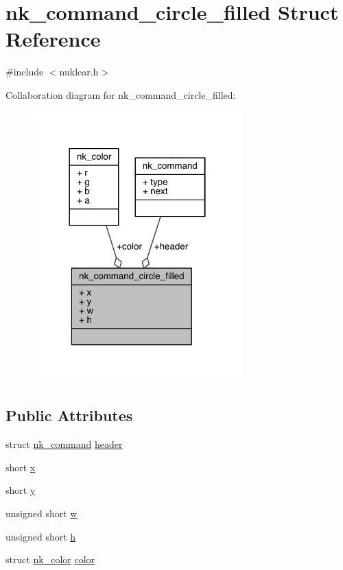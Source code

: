 \hypertarget{structnk__command__circle__filled}{}\section{nk\+\_\+command\+\_\+circle\+\_\+filled Struct Reference}
\label{structnk__command__circle__filled}


{\ttfamily \#include $<$nuklear.\+h$>$}



Collaboration diagram for nk\+\_\+command\+\_\+circle\+\_\+filled\+:
\nopagebreak
\begin{figure}[H]
\begin{center}
\leavevmode
\includegraphics[width=228pt]{structnk__command__circle__filled__coll__graph}
\end{center}
\end{figure}
\subsection*{Public Attributes}
\begin{DoxyCompactItemize}
\item 
struct \mbox{\hyperlink{structnk__command}{nk\+\_\+command}} \mbox{\hyperlink{structnk__command__circle__filled_a42a9f266f1068910d9c7fac048c4d590}{header}}
\item 
short \mbox{\hyperlink{structnk__command__circle__filled_ac8d5a03cb675627590860653ae24eec4}{x}}
\item 
short \mbox{\hyperlink{structnk__command__circle__filled_a85b0338c5be8741816dd7f9ba0693918}{y}}
\item 
unsigned short \mbox{\hyperlink{structnk__command__circle__filled_aafd7973ccf4203a120db5510ea11a98d}{w}}
\item 
unsigned short \mbox{\hyperlink{structnk__command__circle__filled_a60c15bfe4b517a9b0b2a3a8806ff360b}{h}}
\item 
struct \mbox{\hyperlink{structnk__color}{nk\+\_\+color}} \mbox{\hyperlink{structnk__command__circle__filled_a3ccbfd9af3e71ceeae359b12f171128e}{color}}
\end{DoxyCompactItemize}


